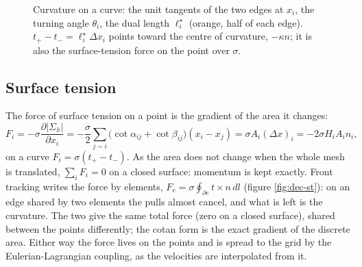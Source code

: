\documentclass[10pt,a4paper]{article}
\theoremstyle{definition}
\begin{document}
\begin{figure}[H]
\centering
{}
\caption{Curvature on a curve: the unit tangents of the two edges at
  $x_i$, the turning angle $\theta_i$, the dual length $\ell^\star_i$
  (orange, half of each edge). $t_+ - t_- = \ell^\star_i \Delta x_i$ points
  toward the centre of curvature, $-\kappa n$; it is also the
  surface-tension force on the point over $\sigma$.}
\label{fig:dec-curve}
\end{figure}

\subsection{Surface tension}

The force of surface tension on a point is the gradient of the area it
changes:
\[
  F_i = -\sigma \frac{\partial |\Sigma_h|}{\partial x_i}
      = -\frac{\sigma}{2} \sum_{j \sim i} \big( \cot\alpha_{ij} +
        \cot\beta_{ij} \big) (x_i - x_j)
      = \sigma A_i (\Delta x)_i = -2 \sigma H_i A_i n_i ,
\]
on a curve $F_i = \sigma (t_+ - t_-)$. As the area does not change when the
whole mesh is translated, $\sum_i F_i = 0$ on a closed surface: momentum is
kept exactly. Front tracking \cite{tryggvason} writes the force by
elements, $F_e = \sigma \oint_{\partial e} t \times n \, dl$ (figure
\ref{fig:dec-st}): on an edge shared by two elements the pulls almost
cancel, and what is left is the curvature. The two give the same total
force (zero on a closed surface), shared between the points differently;
the cotan form is the exact gradient of the discrete area. Either way the
force lives on
the points and is spread to the grid by the Eulerian-Lagrangian coupling,
as the velocities are interpolated from it.
\end{document}
